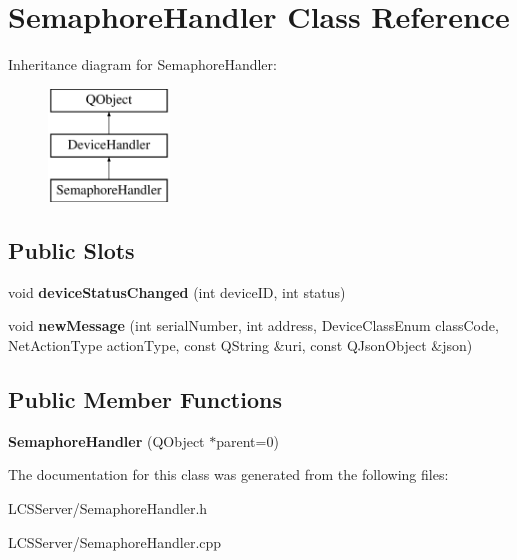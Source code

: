 \hypertarget{class_semaphore_handler}{}\section{Semaphore\+Handler Class Reference}
\label{class_semaphore_handler}
Inheritance diagram for Semaphore\+Handler\+:\begin{figure}[H]
\begin{center}
\leavevmode
\includegraphics[height=3.000000cm]{class_semaphore_handler}
\end{center}
\end{figure}
\subsection*{Public Slots}
\begin{DoxyCompactItemize}
\item 
\mbox{\label{class_semaphore_handler_a9ce184716d0da3e5ec71eb48fbe9a4ff}} 
void {\bfseries device\+Status\+Changed} (int device\+ID, int status)
\item 
\mbox{\label{class_semaphore_handler_afcbf5732d97a67cafc436a92d27824b1}} 
void {\bfseries new\+Message} (int serial\+Number, int address, Device\+Class\+Enum class\+Code, Net\+Action\+Type action\+Type, const Q\+String \&uri, const Q\+Json\+Object \&json)
\end{DoxyCompactItemize}
\subsection*{Public Member Functions}
\begin{DoxyCompactItemize}
\item 
\mbox{\label{class_semaphore_handler_a22f4b37b071c987392f0ee52d862e08d}} 
{\bfseries Semaphore\+Handler} (Q\+Object $\ast$parent=0)
\end{DoxyCompactItemize}


The documentation for this class was generated from the following files\+:\begin{DoxyCompactItemize}
\item 
L\+C\+S\+Server/Semaphore\+Handler.\+h\item 
L\+C\+S\+Server/Semaphore\+Handler.\+cpp\end{DoxyCompactItemize}
